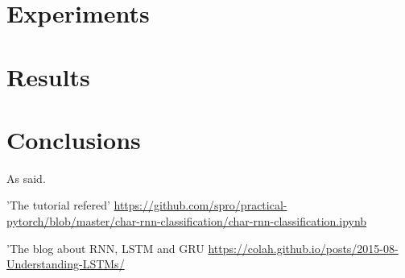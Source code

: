 \documentclass[runningheads]{llncs}
\begin{document}
\section{Experiments}


\section{Results}
\section{Conclusions}


As \cite{Alpher04} said.







\begin{thebibliography}{9}

	'The tutorial refered'
	\url{https://github.com/spro/practical-pytorch/blob/master/char-rnn-classification/char-rnn-classification.ipynb}

'The blog about RNN, LSTM and GRU
\url{https://colah.github.io/posts/2015-08-Understanding-LSTMs/}


\end{thebibliography}
\end{document}
